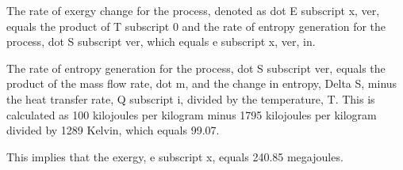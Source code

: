 The rate of exergy change for the process, denoted as dot E subscript x, ver, equals the product of T subscript 0 and the rate of entropy generation for the process, dot S subscript ver, which equals e subscript x, ver, in.

The rate of entropy generation for the process, dot S subscript ver, equals the product of the mass flow rate, dot m, and the change in entropy, Delta S, minus the heat transfer rate, Q subscript i, divided by the temperature, T. This is calculated as 100 kilojoules per kilogram minus 1795 kilojoules per kilogram divided by 1289 Kelvin, which equals 99.07.

This implies that the exergy, e subscript x, equals 240.85 megajoules.
